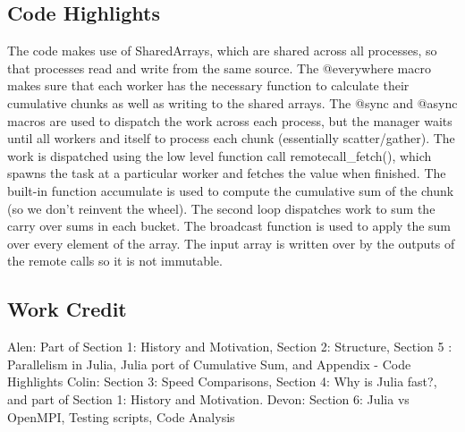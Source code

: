 \documentclass[12pt]{article}
\begin{document}
\subsection{Code Highlights}
The code makes use of SharedArrays, which are shared across all processes, so that processes read and write from the same source. The @everywhere macro makes sure that each worker has the necessary function to calculate their cumulative chunks as well as writing to the shared arrays. The @sync and @async macros are used to dispatch the work across each process, but the manager waits until all workers and itself to process each chunk (essentially scatter/gather). The work is dispatched using the low level function call remotecall\_fetch(), which spawns the task at a particular worker and fetches the value when finished. The built-in function accumulate is used to compute the cumulative sum of the chunk (so we don’t reinvent the wheel). The second loop dispatches work to sum the carry over sums in each bucket. The broadcast function is used to apply the sum over every element of the array. The input array is written over by the outputs of the remote calls so it is not immutable.

\subsection{Work Credit}
Alen: Part of Section 1: History and Motivation, Section 2: Structure, Section 5 : Parallelism in Julia, Julia port of Cumulative Sum, and Appendix - Code Highlights  \newline
Colin: Section 3: Speed Comparisons, Section 4: Why is Julia fast?, and part of Section 1: History and Motivation. \newline
Devon: Section 6: Julia vs OpenMPI, Testing scripts, Code Analysis

\printbibliography
\end{document}
